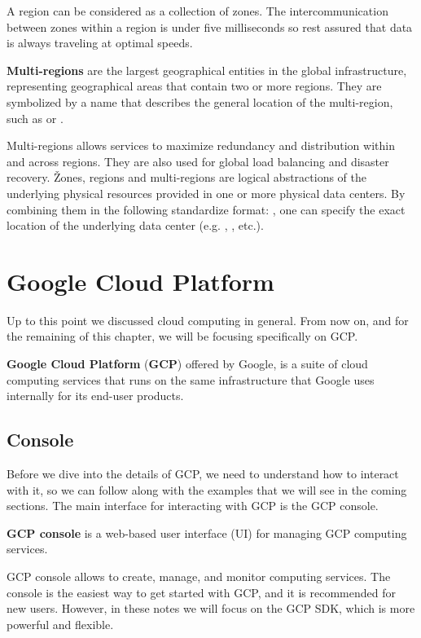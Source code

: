 A region can be considered as a collection of zones. The intercommunication between zones within a region is under five
milliseconds so rest assured that data is always traveling at optimal speeds.

\textbf{Multi-regions} are the largest geographical entities in the global infrastructure, representing geographical
areas that contain two or more regions. They are symbolized by a name that describes the general location of the
multi-region, such as  or .
\ed

Multi-regions allows services to maximize redundancy and distribution within and across regions. They are also used
for global load balancing and disaster recovery. \v

Zones, regions and multi-regions are logical abstractions of the underlying physical resources provided in one or more
physical data centers. By combining them in the following standardize format: , one can
specify the exact location of the underlying data center (e.g. , , etc.).


\section{Google Cloud Platform}

Up to this point we discussed cloud computing in general. From now on, and for the remaining of this chapter, we will
be focusing specifically on GCP\@.

\textbf{Google Cloud Platform} (\textbf{GCP}) offered by Google, is a suite of cloud computing services that runs on
the same infrastructure that Google uses internally for its end-user products.
\ed

\subsection{Console}

Before we dive into the details of GCP, we need to understand how to interact with it, so we can follow along with the
examples that we will see in the coming sections. The main interface for interacting with GCP is the GCP console.

\textbf{GCP console} is a web-based user interface (UI) for managing GCP computing services.
\ed

GCP console allows to create, manage, and monitor computing services. The console is the easiest way to get started
with GCP, and it is recommended for new users. However, in these notes we will focus on the GCP SDK, which is more
powerful and flexible.

